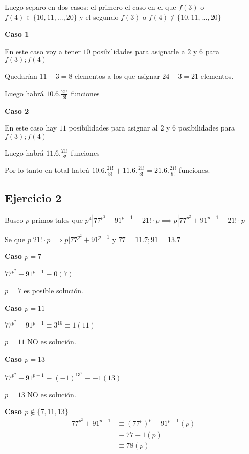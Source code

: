 Luego separo en dos casos: el primero el caso en el que $ f(3) $ o $ f(4) \in \{ 10,11,...,20 \} $ y el segundo $ f(3) $ o $ f(4) \not \in \{ 10,11,...,20 \} $

\textbf{Caso 1}

En este caso voy a tener $10$ posibilidades para asignarle a $2$ y $6$ para $ f(3); f(4) $

Quedarían $ 11-3 = 8 $ elementos a los que asignar $ 24-3 = 21 $ elementos.

Luego habrá $ 10.6.\frac{21!}{8!} $ funciones

\textbf{Caso 2}

En este caso hay $11$ posibilidades para asignar al $2$ y $6$ posibilidades para $ f(3); f(4) $

Luego habrá $ 11.6.\frac{21!}{8!} $ funciones

Por lo tanto en total habrá $ 10.6.\frac{21!}{8!} + 11.6.\frac{21!}{8!} = 21.6.\frac{21!}{8!} $ funciones.

\subsection{Ejercicio 2}

Busco $p$ primos tales que $ p^4 | 77^{p^2} + 91^{p-1} + 21! \cdot p \implies p | 77^{p^2} + 91^{p-1} + 21! \cdot p $

Se que $ p | 21! \cdot p \implies p | 77^{p^2} + 91^{p-1} $ y $ 77 = 11.7; 91 = 13.7 $

\textbf{Caso $ p = 7 $}

$ 77^{p^2} + 91^{p-1} \equiv 0 (7) $ 

$ p = 7 $ es posible solución.

\textbf{Caso $ p = 11 $}

$ 77^{p^2} + 91^{p-1} \equiv 3^{10} \equiv 1(11) $

$ p = 11 $ NO es solución.

\textbf{Caso $ p = 13 $}

$ 77^{p^2} + 91^{p-1} \equiv (-1)^{13^2} \equiv -1 (13) $

$ p = 13 $ NO es solución.

\textbf{Caso $ p \not \in \{ 7, 11, 13 \} $}
\begin{align*}
    77^{p^2} + 91^{p-1} &\equiv (77^p)^p + 91^{p-1} (p) \\
    &\equiv 77 + 1 (p) \\
    &\equiv 78 (p) \\
\end{align*}

